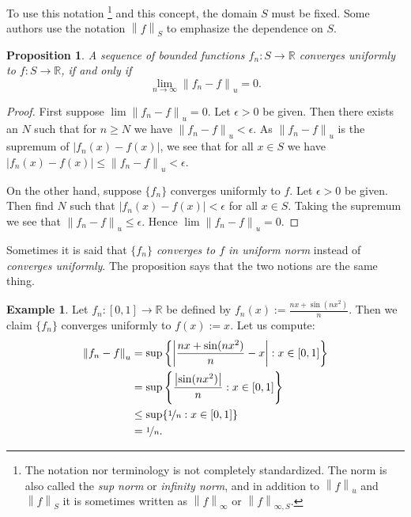 \documentclass[12pt]{book}
\newcommand{\abs}[1]{\left\lvert {#1} \right\rvert}
\newcommand{\norm}[1]{\left\lVert {#1} \right\rVert}
\newcommand{\R}{{\mathbb{R}}}
\newcommand{\myindex}[1]{#1\index{#1}}
\theoremstyle{plain}
\newtheorem{prop}[thm]{Proposition}
\theoremstyle{remark}
\theoremstyle{definition}
\theoremstyle{exercise}
\theoremstyle{example}
\newtheorem{example}[thm]{Example}
\begin{document}
To use this notation%
\footnote{The notation nor terminology is not completely standardized.  The norm is
also called the
\emph{\myindex{sup norm}} or
\emph{\myindex{infinity norm}}, and in addition
to $\norm{f}_u$ and $\norm{f}_S$ it is sometimes written
as $\norm{f}_{\infty}$ or $\norm{f}_{\infty,S}$.}
and this concept, the domain $S$ must be fixed.  Some authors
use
the notation
$\norm{f}_S$ to emphasize the dependence on $S$.

\begin{prop}
A sequence of bounded functions $f_n \colon S \to \R$ converges
uniformly to $f \colon S \to \R$, if and only if
\begin{equation*}
\lim_{n\to\infty} \norm{f_n - f}_u = 0 .
\end{equation*}
\end{prop}

\begin{proof}
First suppose 
$\lim \norm{f_n - f}_u = 0$.  Let $\epsilon > 0$ be
given.  Then there exists an $N$ such that
for $n \geq N$ we have $\norm{f_n - f}_u < \epsilon$.  As $\norm{f_n-f}_u$
is the supremum of $\abs{f_n(x)-f(x)}$, we see that for all $x \in S$
we have $\abs{f_n(x)-f(x)} \leq \norm{f_n - f}_u < \epsilon$.

On the other hand, suppose $\{ f_n \}$ converges uniformly to $f$.
Let $\epsilon > 0$ be given.  Then find $N$ such that 
$\abs{f_n(x)-f(x)} < \epsilon$ for all $x \in S$.
Taking the supremum we see that
$\norm{f_n - f}_u \leq \epsilon$.  Hence $\lim \norm{f_n-f}_u = 0$.
\end{proof}

Sometimes it is said that \emph{$\{ f_n \}$ converges to $f$ in uniform norm}
instead of \emph{converges uniformly}.  The proposition
says that the two notions are the same thing.

\begin{example}
Let $f_n \colon [0,1] \to \R$ be defined by $f_n(x) := \frac{nx+ \sin(nx^2)}{n}$.
Then we claim $\{ f_n \}$ converges uniformly to $f(x) := x$.  Let us compute:
\begin{equation*}
\begin{split}
\norm{f_n-f}_u
& =
\sup \left\{ \abs{\frac{nx+ \sin(nx^2)}{n} - x} : x \in [0,1] \right\}
\\
& =
\sup \left\{ \frac{\abs{\sin(nx^2)}}{n} : x \in [0,1] \right\}
\\
& \leq
\sup \{ \nicefrac{1}{n} : x \in [0,1] \}
\\
& = \nicefrac{1}{n}.
\end{split}
\end{equation*}
\end{example}
\end{document}
